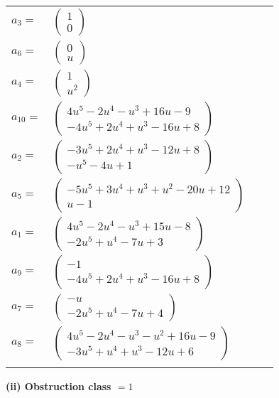 \documentclass[1p]{elsarticle_modified}
\theoremstyle{definition}
\begin{document}
\begin{tabular}{m{7pt} m{180pt} m{7pt} m{180pt} }
\flushright $a_{3}=$&$\begin{pmatrix}1\\0\end{pmatrix}$ \\
\flushright $a_{6}=$&$\begin{pmatrix}0\\u\end{pmatrix}$ \\
\flushright $a_{4}=$&$\begin{pmatrix}1\\u^2\end{pmatrix}$ \\
\flushright $a_{10}=$&$\begin{pmatrix}4 u^5-2 u^4- u^3+16 u-9\\-4 u^5+2 u^4+u^3-16 u+8\end{pmatrix}$ \\
\flushright $a_{2}=$&$\begin{pmatrix}-3 u^5+2 u^4+u^3-12 u+8\\- u^5-4 u+1\end{pmatrix}$ \\
\flushright $a_{5}=$&$\begin{pmatrix}-5 u^5+3 u^4+u^3+u^2-20 u+12\\u-1\end{pmatrix}$ \\
\flushright $a_{1}=$&$\begin{pmatrix}4 u^5-2 u^4- u^3+15 u-8\\-2 u^5+u^4-7 u+3\end{pmatrix}$ \\
\flushright $a_{9}=$&$\begin{pmatrix}-1\\-4 u^5+2 u^4+u^3-16 u+8\end{pmatrix}$ \\
\flushright $a_{7}=$&$\begin{pmatrix}- u\\-2 u^5+u^4-7 u+4\end{pmatrix}$ \\
\flushright $a_{8}=$&$\begin{pmatrix}4 u^5-2 u^4- u^3- u^2+16 u-9\\-3 u^5+u^4+u^3-12 u+6\end{pmatrix}$\\&\end{tabular}
\flushleft \textbf{(ii) Obstruction class $= 1$}\\~\\
\end{document}

